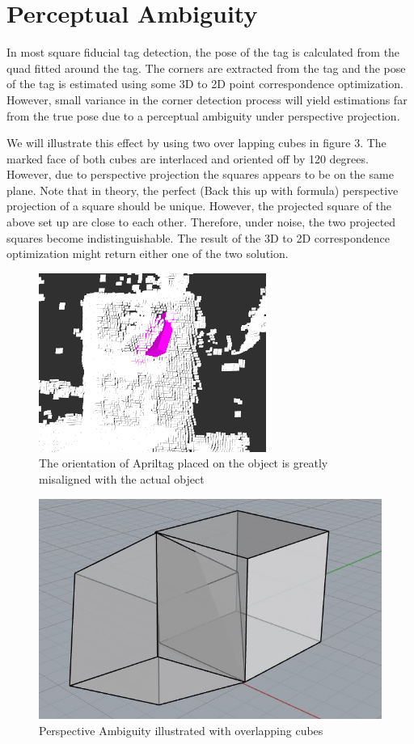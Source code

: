 \section{Perceptual Ambiguity}
\label{sec:problem}
In most square fiducial tag detection, the pose of the tag is calculated from the quad fitted around the tag. The corners are extracted from the tag and the pose of the tag is estimated using some 3D to 2D point correspondence optimization. However, small variance in the corner detection process will yield estimations far from the true pose due to a perceptual ambiguity under perspective projection. 

We will illustrate this effect by using two over lapping cubes in figure 3. The marked face of both cubes are interlaced and oriented off by 120 degrees. However, due to perspective projection the squares appears to be on the same plane. Note that in theory, the perfect (Back this up with formula) perspective projection of a square should be unique. However, the projected square of the above set up are close to each other. Therefore, under noise, the two projected squares become indistinguishable. The result of the 3D to 2D correspondence optimization might return either one of the two solution.
\begin{figure}
\centering
\includegraphics[width=\columnwidth]{figs/mismatch_tag}
\caption{The orientation of Apriltag placed on the object is greatly misaligned with the actual object}
\label{fig:calib}
\end{figure}

\begin{figure}
\centering
\includegraphics[width=\columnwidth]{figs/perspective_fig}
\caption{Perspective Ambiguity illustrated with overlapping cubes}
\label{fig:calib}
\end{figure}